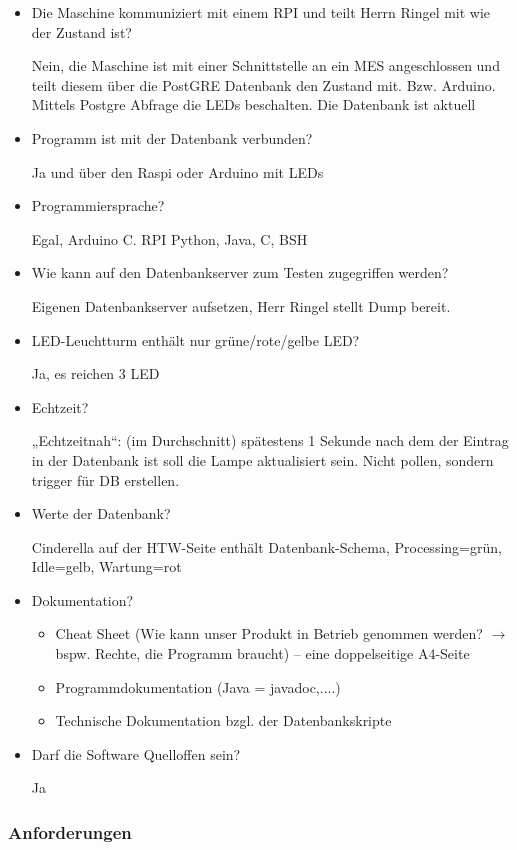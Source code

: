 \documentclass{scrartcl}
\begin{document}
\begin{itemize}
\item Die Maschine kommuniziert mit einem RPI und teilt Herrn Ringel mit wie der Zustand ist?

Nein, die Maschine ist mit einer Schnittstelle an ein MES angeschlossen und teilt diesem über die PostGRE Datenbank den Zustand mit. Bzw. Arduino. Mittels Postgre Abfrage die LEDs beschalten. Die Datenbank ist aktuell
\item Programm ist mit der Datenbank verbunden?

Ja und über den Raspi oder Arduino mit LEDs
\item Programmiersprache?

Egal, Arduino C. RPI Python, Java, C, BSH
\item Wie kann auf den Datenbankserver zum Testen zugegriffen werden?

Eigenen Datenbankserver aufsetzen, Herr Ringel stellt Dump bereit.
\item LED-Leuchtturm enthält nur grüne/rote/gelbe LED?

Ja, es reichen 3 LED
\item Echtzeit? 

„Echtzeitnah“: (im Durchschnitt) spätestens 1 Sekunde nach dem der Eintrag in der Datenbank ist soll die Lampe aktualisiert sein. Nicht pollen, sondern trigger für DB erstellen.
\item Werte der Datenbank?

Cinderella auf der HTW-Seite enthält Datenbank-Schema, Processing=grün, Idle=gelb, Wartung=rot
\item Dokumentation?
    \begin{itemize}
    \item Cheat Sheet (Wie kann unser Produkt in Betrieb genommen werden? $\to$ bspw. Rechte, die Programm braucht) -- eine doppelseitige A4-Seite 
    \item Programmdokumentation (Java = javadoc,....)
    \item Technische Dokumentation bzgl. der Datenbankskripte
    \end{itemize}
\item Darf die Software Quelloffen sein?

Ja
\end{itemize}
\subsubsection{Anforderungen}
\end{document}
